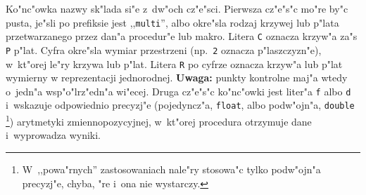 Ko"nc"owka nazwy sk"lada si"e z~dw"och cz"e"sci. Pierwsza cz"e"s"c mo"re
by"c pusta, je"sli po prefiksie jest ,,\texttt{multi}'', albo
okre"sla rodzaj krzywej lub p"lata przetwarzanego przez dan"a procedur"e lub
makro. Litera \texttt{C} oznacza krzyw"a za"s \texttt{P} p"lat. Cyfra
okre"s\-la wymiar przestrzeni (np.\ \texttt{2} oznacza p"laszczyzn"e),
w~kt"orej le"ry krzywa lub p"lat. Litera \texttt{R} po cyfrze oznacza
krzyw"a lub p"lat wymierny w reprezentacji jednorodnej. \textbf{Uwaga:} punkty
kontrolne maj"a wtedy o~jedn"a wsp"o"lrz"edn"a wi"ecej. Druga cz"e"s"c
ko"nc"owki jest liter"a \texttt{f} albo \texttt{d} i~wskazuje odpowiednio
precyzj"e (pojedyncz"a, \texttt{float}, albo podw"ojn"a, \texttt{double}%
\footnote{W~,,powa"rnych'' zastosowaniach nale"ry
stosowa"c tylko podw"ojn"a precyzj"e, chyba, "re i~ona nie wystarczy.})
arytmetyki zmiennopozycyjnej, w~kt"orej procedura otrzymuje dane
i~wyprowadza wyniki.

